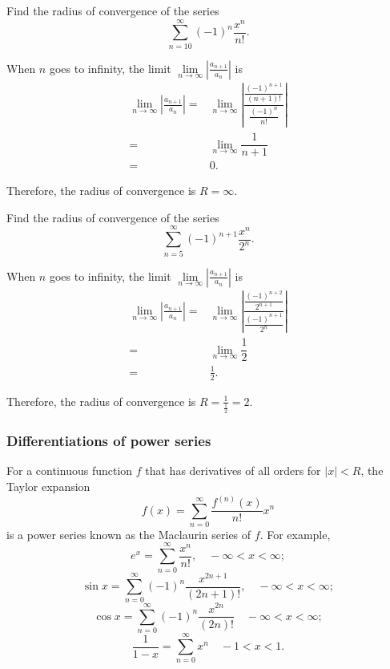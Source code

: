 \begin{example}
  Find the radius of convergence of the series
  \[\sum_{n=10}^\infty (-1)^n \frac{x^n}{n!}.\]
\end{example}
\begin{solution}
  When $n$ goes to infinity, the limit $\lim\limits_{n\to \infty}\left|\frac{a_{n+1}}{a_n}\right|$ is
  \[
  \begin{aligned}
    \lim\limits_{n\to \infty}\left|\frac{a_{n+1}}{a_n}\right|=&\lim\limits_{n\to \infty}\left|\dfrac{\frac{(-1)^{n+1}}{(n+1)!}}{\frac{(-1)^n}{n!}}\right|\\
    =&\lim\limits_{n\to \infty}\dfrac{1}{n+1}\\
    =&0.
  \end{aligned}  
  \]

  Therefore, the radius of convergence is $R=\infty$.
\end{solution}
\begin{exercise}
  Find the radius of convergence of the series
  \[\sum_{n=5}^\infty (-1)^{n+1} \frac{x^n}{2^n}.\]
\end{exercise}
\begin{exersol}
  When $n$ goes to infinity, the limit $\lim\limits_{n\to \infty}\left|\frac{a_{n+1}}{a_n}\right|$ is
  \[
  \begin{aligned}
    \lim\limits_{n\to \infty}\left|\frac{a_{n+1}}{a_n}\right|=&\lim\limits_{n\to \infty}\left|\dfrac{\frac{(-1)^{n+2}}{2^{n+1}}}{\frac{(-1)^{n+1}}{2^n}}\right|\\
    =&\lim\limits_{n\to \infty}\dfrac{1}{2}\\
    =&\frac12.
  \end{aligned}  
  \]

  Therefore, the radius of convergence is $R=\frac{1}{\frac12}=2$.
\end{exersol}

\subsubsection*{Differentiations of power series}

For a continuous function $f$ that has derivatives of all orders for $|x|<R$, the Taylor expansion 
\[f(x)=\sum\limits_{n=0}^\infty\dfrac{f^{(n)}(x)}{n!}x^n\]
is a power series known as the Maclaurin series of $f$. For example,
\[e^{x} = \sum_{n=0}^{\infty} \frac{x^{n}}{n!}, \quad -\infty<x<\infty;\]
\[\sin x = \sum_{n=0}^{\infty} (-1)^{n} \frac{x^{2n+1}}{(2n+1)!}, \quad -\infty<x<\infty;\]
\[\cos x = \sum_{n=0}^{\infty} (-1)^{n} \frac{x^{2n}}{(2n)!} \quad -\infty<x<\infty;\]
\[\frac{1}{1-x} = \sum_{n=0}^{\infty} x^{n} \quad -1<x<1.\]

